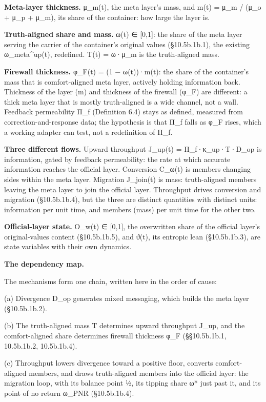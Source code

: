 \documentclass[
]{article}
\begin{document}
\textbf{Meta-layer thickness.} μ\_m(t), the meta layer's mass, and m(t)
= μ\_m / (μ\_o + μ\_p + μ\_m), its share of the container: how large the
layer is.

\textbf{Truth-aligned share and mass.} ω(t) ∈ {[}0,1{]}: the share of
the meta layer serving the carrier of the container's original values
(§10.5b.1b.1), the existing ω\_meta\^{}up(t), redefined. T(t) = ω·μ\_m
is the truth-aligned mass.

\textbf{Firewall thickness.} φ\_F(t) = (1 − ω(t))·m(t): the share of the
container's mass that is comfort-aligned meta layer, actively holding
information back. Thickness of the layer (m) and thickness of the
firewall (φ\_F) are different: a thick meta layer that is mostly
truth-aligned is a wide channel, not a wall. Feedback permeability Π\_f
(Definition 6.4) stays as defined, measured from correction-and-response
data; the hypothesis is that Π\_f falls as φ\_F rises, which a working
adapter can test, not a redefinition of Π\_f.

\textbf{Three different flows.} Upward throughput J\_up(t) =
Π\_f·κ\_up·T·D\_op is information, gated by feedback permeability: the
rate at which accurate information reaches the official layer.
Conversion C\_ω(t) is members changing sides within the meta layer.
Migration J\_join(t) is mass: truth-aligned members leaving the meta
layer to join the official layer. Throughput drives conversion and
migration (§10.5b.1b.4), but the three are distinct quantities with
distinct units: information per unit time, and members (mass) per unit
time for the other two.

\textbf{Official-layer state.} O\_w(t) ∈ {[}0,1{]}, the overwritten
share of the official layer's original-values content (§10.5b.1b.5), and
ϑ(t), its entropic lean (§10.5b.1b.3), are state variables with their
own dynamics.

\textbf{The dependency map.}

The mechanisms form one chain, written here in the order of cause:

(a) Divergence D\_op generates mixed messaging, which builds the meta
layer (§10.5b.1b.2).

(b) The truth-aligned mass T determines upward throughput J\_up, and the
comfort-aligned share determines firewall thickness φ\_F (§§10.5b.1b.1,
10.5b.1b.2, 10.5b.1b.4).

(c) Throughput lowers divergence toward a positive floor, converts
comfort-aligned members, and draws truth-aligned members into the
official layer: the migration loop, with its balance point ½, its
tipping share ω* just past it, and its point of no return ω\_PNR
(§10.5b.1b.4).
\end{document}
